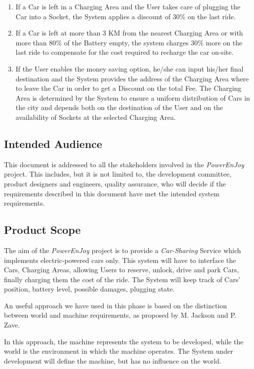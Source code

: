 \begin{enumerate}[label=\textbf{G\arabic*}]
	\item If a Car is left in a Charging Area and the User takes care of plugging the Car into a Socket, the System applies a discount of 30\% on the last ride.
	\item If a Car is left at more than 3 KM from the nearest Charging Area or with more than 80\% of the Battery empty, the system charges 30\% more on the last ride to compensate for the cost required to recharge the car on-site.
	\item If the User enables the money saving option, he/she can input his/her final destination and the System provides the address of the Charging Area where to leave the Car in order to get a Discount on the total Fee. The Charging Area is determined by the System to ensure a uniform distribution of Cars in the city and depends both on the destination of the User and on the availability of Sockets at the selected Charging Area.
\end{enumerate}

\subsection{Intended Audience}
This document is addressed to all the stakeholders involved in the \emph{PowerEnJoy} project. This includes, but it is not limited to, the development committee, product designers and engineers, quality assurance, who will decide if the requirements described in this document have met the intended system requirements.

\subsection{Product Scope}
The aim of the \emph{PowerEnJoy} project is to provide a \textit{Car-Sharing} Service which implements electric-powered cars only.
This system will have to interface the Cars, Charging Areas, allowing Users to reserve, unlock, drive and park Cars, finally charging them the cost of the ride. 
The System will keep track of Cars' position, battery level, possible damages, plugging state.

An useful approach we have used in this phase is based on the distinction between world and machine requirements, as proposed by M. Jackson and P. Zave.

In this approach, the machine represents the system to be developed, while the world is the environment in which the machine operates.
The System under development will define the machine, but has no influence on the world.

